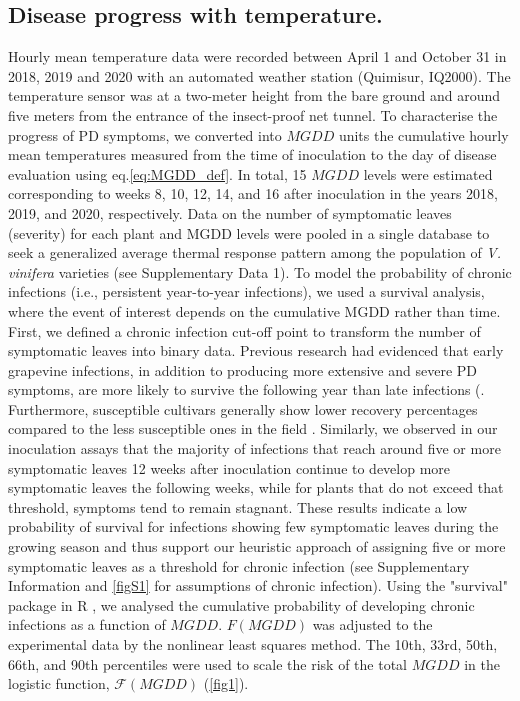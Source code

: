     \subsection{Disease progress with temperature.} Hourly mean temperature
    data
    were recorded between April 1 and October 31 in 2018, 2019 and 2020 with an
    automated weather station (Quimisur, IQ2000). The temperature sensor was at
    a
    two-meter height from the bare ground and around five meters from the
    entrance
    of the insect-proof net tunnel. To characterise the progress of PD
    symptoms, we
    converted into $MGDD$ units the cumulative hourly mean temperatures
    measured
    from the time of inoculation to the day of disease evaluation using
    eq.\ref{eq:MGDD_def}. In total, 15 $MGDD$ levels were estimated
    corresponding
    to weeks 8, 10, 12, 14, and 16 after inoculation in the years 2018, 2019,
    and
    2020, respectively. Data on the number of symptomatic leaves (severity) for
    each plant and MGDD levels were pooled in a single database to seek a
    generalized average thermal response pattern among the population of
    \textit{V.
        vinifera} varieties (see Supplementary Data 1). To model the
    probability of
    chronic infections (i.e., persistent year-to-year infections), we used a
    survival analysis, where the event of interest depends on the cumulative
    MGDD
    rather than time. First, we defined a chronic infection cut-off point to
    transform the number of symptomatic leaves into binary data. Previous
    research
    had evidenced that early grapevine infections, in addition to producing
    more
    extensive and severe PD symptoms, are more likely to survive the following
    year
    than late infections (\cite{Feil2001, Feil2003, Lieth2011}. Furthermore,
    susceptible cultivars generally show lower recovery percentages compared to
    the
    less susceptible ones in the field
    \cite{purcell1974spatial,purcell1981vector}.
    Similarly, we observed in our inoculation assays that the majority of
    infections that reach around five or more symptomatic leaves 12 weeks after
    inoculation continue to develop more symptomatic leaves the following
    weeks,
    while for plants that do not exceed that threshold, symptoms tend to remain
    stagnant. These results indicate a low probability of survival for
    infections
    showing few symptomatic leaves during the growing season and thus support
    our
    heuristic approach of assigning five or more symptomatic leaves as a
    threshold
    for chronic infection (see Supplementary Information and \cref{figS1}
    for assumptions of chronic infection). Using the "survival" package in R
    \cite{survival-package}, we analysed the cumulative probability of
    developing
    chronic infections as a function of $MGDD$.  $F(MGDD)$ was adjusted to the
    experimental data by the nonlinear least squares method. The 10th, 33rd,
    50th,
    66th, and 90th percentiles were used to scale the risk of the total $MGDD$
    in
    the logistic function, $\mathcal{F}(MGDD)$ (\cref {fig1}).


